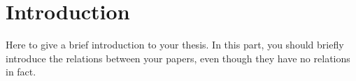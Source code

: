 \chapter{Introduction}

Here to give a brief introduction to your thesis.
In this part, you should briefly introduce the relations between your papers, even though they have no relations in fact.
